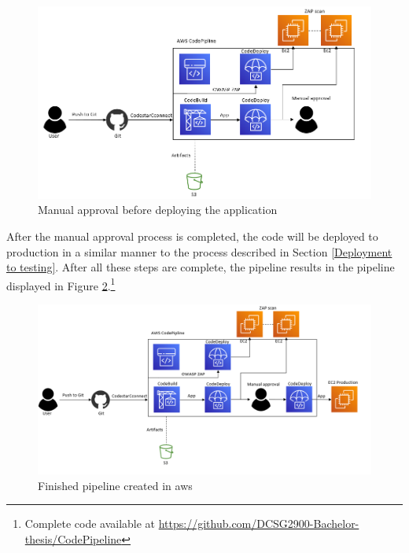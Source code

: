 \vspace{2mm}
\begin{figure}[H]
    \centering
    \includegraphics[width=0.8\columnwidth]{Images/aws-piplin-6.png}
    \caption{Manual approval before deploying the application}
    \label{fig: Manual approval before deploying the application}
\end{figure}

After the manual approval process is completed, the code will be deployed to production in a similar manner to the process described in Section \ref{Deployment to testing}. After all these steps are complete, the pipeline results in the pipeline displayed in Figure \ref{fig: Finished pipeline created in AWS}.\footnote{Complete code available at \url{https://github.com/DCSG2900-Bachelor-thesis/CodePipeline}}

\vspace{2mm}
\begin{figure}[H]
    \centering
    \includegraphics[width=0.8\columnwidth]{Images/aws-piplin-7.png}
    \caption{Finished pipeline created in \acrshort{aws}}
    \label{fig: Finished pipeline created in AWS}
\end{figure}